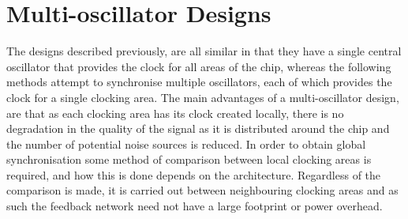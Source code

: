 \section{Multi-oscillator Designs}
The designs described previously, are all similar in that they have a single central oscillator that provides the clock for all areas of the chip, whereas the following methods attempt to synchronise multiple oscillators, each of which provides the clock for a single clocking area. The main advantages of a multi-oscillator design, are that as each clocking area has its clock created locally, there is no degradation in the quality of the signal as it is distributed around the chip and the number of potential noise sources is reduced. In order to obtain global synchronisation some method of comparison between local clocking areas is required, and how this is done depends on the architecture. Regardless of the comparison is made, it is carried out between neighbouring clocking areas and as such the feedback network need not have a large footprint or power overhead.

